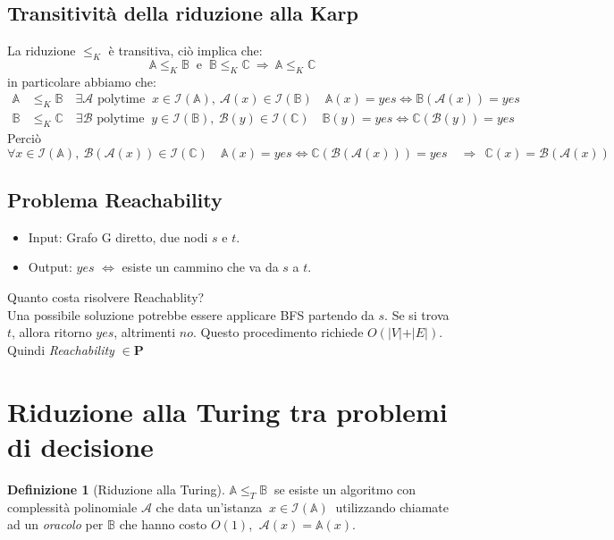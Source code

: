 \documentclass[a4paper]{article}
\theoremstyle{definition}
\newtheorem{definit}{Definizione}[subsection]
\newcommand{\p}{\mathbf{P}}
\newcommand{\prob}[1]{\mathbb{#1}}
\newcommand{\instance}[1]{\mathcal{I}(\prob{#1})}
\newcommand{\alg}[1]{\mathcal{#1}}
\begin{document}
	 \subsection{Transitività della riduzione alla Karp}
		 La riduzione $ \leq_K $ è transitiva, ciò implica che:
		 \[
			 \prob{A} \leq_K \prob{B}\ \text{ e }\ \prob{B}\leq_K \prob{C} \ \Rightarrow \ \prob{A}\leq_K \prob{C}
		 \]
		 in particolare abbiamo che:
		 \begin{align*}
			 \prob{A} &\leq_K \prob{B} \quad \exists \alg{A} \text{ polytime } \ x\in \instance{A},\ \alg{A}(x)\in \instance{B}\quad \prob{A}(x) = yes \Leftrightarrow \prob{B}(\alg{A}(x)) = yes \\
			 \prob{B} &\leq_K \prob{C} \quad \exists \alg{B} \text{ polytime } \ y\in \instance{B},\ \alg{B}(y)\in \instance{C}\quad \prob{B}(y) = yes \Leftrightarrow \prob{C}(\alg{B}(y)) = yes
		 \end{align*}
		 Perciò
		 \[
			 \forall x \in \instance{A},\ \alg{B}(\alg{A}(x)) \in \instance{C} \quad \prob{A}(x) = yes \Leftrightarrow
			 \prob{C}(\alg{B}(\alg{A}(x))) = yes \quad \Rightarrow \ \ \prob{C}(x) = \alg{B}(\alg{A}(x))
		 \]

 	\subsection{Problema Reachability}
	 	\begin{itemize}
	 		\item Input: Grafo G diretto, due nodi $ s $ e $ t $.
	 		\item Output: $ yes $ $ \Leftrightarrow $ esiste un cammino che va da $ s $ a $ t $.
	 	\end{itemize}
	 	Quanto costa risolvere Reachablity?\\
	 	Una possibile soluzione potrebbe essere applicare BFS partendo da $ s $. Se si trova $ t $, allora ritorno $ yes $, altrimenti $ no $. Questo procedimento richiede $ O(\vert V\vert+\vert E\vert) $. Quindi \textit{Reachability} $ \in \p $ 
	 	
	 \section{Riduzione alla Turing tra problemi di decisione}
		 \begin{definit}[Riduzione alla Turing]
		 	$ \prob{A}\leq_T \prob{B} \ $ se esiste un algoritmo con complessità polinomiale $ \alg{A} $ che data un'istanza $ \ x \in \instance{A} \ $ utilizzando chiamate ad un \textit{oracolo} per $ \prob{B} $ che hanno costo $ O(1) $, $ \ \alg{A}(x) = \prob{A}(x) $.
		 \end{definit}
	 
\end{document}
